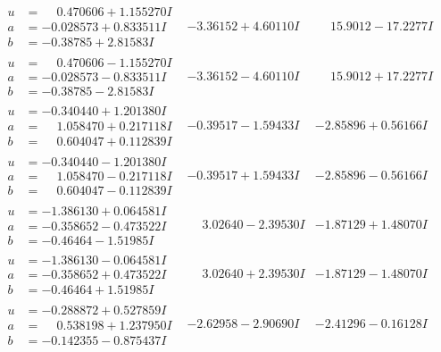 \documentclass[1p]{elsarticle_modified}
\theoremstyle{definition}
\begin{document}
$$\begin{array}{c|c|c}
\begin{aligned}
u &= \phantom{-}0.470606 + 1.155270 I \\
a &= -0.028573 + 0.833511 I \\
b &= -0.38785 + 2.81583 I\end{aligned}
 & -3.36152 + 4.60110 I & \phantom{-}15.9012 - 17.2277 I \\ \hline\begin{aligned}
u &= \phantom{-}0.470606 - 1.155270 I \\
a &= -0.028573 - 0.833511 I \\
b &= -0.38785 - 2.81583 I\end{aligned}
 & -3.36152 - 4.60110 I & \phantom{-}15.9012 + 17.2277 I \\ \hline\begin{aligned}
u &= -0.340440 + 1.201380 I \\
a &= \phantom{-}1.058470 + 0.217118 I \\
b &= \phantom{-}0.604047 + 0.112839 I\end{aligned}
 & -0.39517 - 1.59433 I & -2.85896 + 0.56166 I \\ \hline\begin{aligned}
u &= -0.340440 - 1.201380 I \\
a &= \phantom{-}1.058470 - 0.217118 I \\
b &= \phantom{-}0.604047 - 0.112839 I\end{aligned}
 & -0.39517 + 1.59433 I & -2.85896 - 0.56166 I \\ \hline\begin{aligned}
u &= -1.386130 + 0.064581 I \\
a &= -0.358652 - 0.473522 I \\
b &= -0.46464 - 1.51985 I\end{aligned}
 & \phantom{-}3.02640 - 2.39530 I & -1.87129 + 1.48070 I \\ \hline\begin{aligned}
u &= -1.386130 - 0.064581 I \\
a &= -0.358652 + 0.473522 I \\
b &= -0.46464 + 1.51985 I\end{aligned}
 & \phantom{-}3.02640 + 2.39530 I & -1.87129 - 1.48070 I \\ \hline\begin{aligned}
u &= -0.288872 + 0.527859 I \\
a &= \phantom{-}0.538198 + 1.237950 I \\
b &= -0.142355 - 0.875437 I\end{aligned}
 & -2.62958 - 2.90690 I & -2.41296 - 0.16128 I \\ \hline\begin{aligned}

\end{aligned}
\end{array}$$
\end{document}
